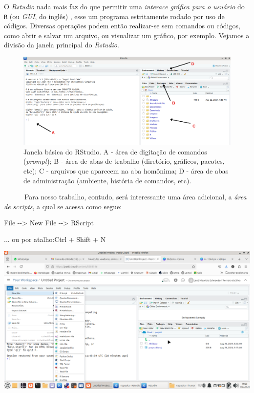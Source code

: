 \documentclass[
  letterpaper,
  DIV=11,
  numbers=noendperiod]{scrreprt}
\newenvironment{Shaded}{\begin{snugshade}}{\end{snugshade}}
\newcommand{\NormalTok}[1]{\textcolor[rgb]{0.00,0.23,0.31}{#1}}
\newcommand{\OtherTok}[1]{\textcolor[rgb]{0.00,0.23,0.31}{#1}}
\newcommand{\SpecialCharTok}[1]{\textcolor[rgb]{0.37,0.37,0.37}{#1}}
\begin{document}
\hfill\break
\textbar{} O \emph{Rstudio} nada mais faz do que permitir uma
\emph{interace gráfica para o usuário} do \texttt{R} (ou \emph{GUI}, do
inglês) , esse um programa estritamente rodado por uso de códigos.
Diversas operações podem então realizar-se sem comandos ou códigos, como
abrir e salvar um arquivo, ou visualizar um gráfico, por exemplo.
Vejamos a divisão da janela principal do \emph{Rstudio}.

\begin{figure}[H]

{\centering \includegraphics{rstudioWindows2.png}

}

\caption{Janela básica do RStudio. A - área de digitação de comandos
(\emph{prompt}); B - área de abas de trabalho (diretório, gráficos,
pacotes, etc); C - arquivos que aparecem na aba homônima; D - área de
abas de administração (ambiente, história de comandos, etc).}

\end{figure}%

~~~~~~Para nosso trabalho, contudo, será interessante uma área
adicional, a \emph{área de scripts}, a qual se acessa como segue:

\begin{Shaded}
\begin{Highlighting}[]
\NormalTok{File }\SpecialCharTok{{-}}\OtherTok{{-}\textgreater{}}\NormalTok{ New File }\SpecialCharTok{{-}}\OtherTok{{-}\textgreater{}}\NormalTok{ RScript}

\NormalTok{... ou por atalho}\SpecialCharTok{:}\NormalTok{Ctrl }\SpecialCharTok{+}\NormalTok{ Shift }\SpecialCharTok{+}\NormalTok{ N}
\end{Highlighting}
\end{Shaded}

\includegraphics{rstudioScript.png}
\end{document}
